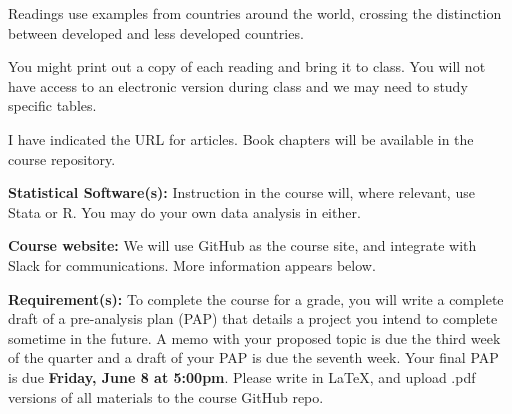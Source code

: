 \documentclass[11pt]{article}
\begin{document}
Readings use examples from countries around the world, crossing the 
distinction between developed
and less developed countries. 

You might print out a copy of each reading and bring it to class. You will not have access to an electronic version during
class and we may need to study specific tables. 

I have indicated the URL for articles. Book chapters
will be available in the course repository.

\textbf {\large Statistical Software(s):}  Instruction in the course will, where relevant, use Stata or R. You may do your own data analysis in either.  

\textbf{\large Course website:} We will use GitHub as the course site, and integrate with Slack for communications. More information appears below.

\textbf {\large Requirement(s):}  To complete the course for a grade, you will write a complete draft of a 
pre-analysis plan (PAP) that details a project you intend to complete sometime in the future. A memo with your proposed topic is due the third week of the quarter and a draft of your PAP is due the seventh week. Your final PAP is due \textbf{Friday, June 8 at 5:00pm}.  Please write in LaTeX, and upload .pdf versions of all materials to the course GitHub repo.
\end{document}

